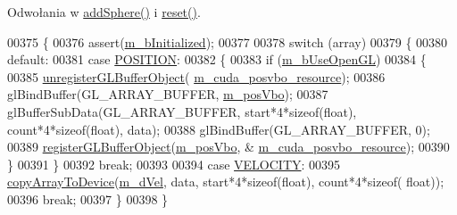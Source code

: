 Odwołania w \hyperlink{particle_system_8cpp_source_l00485}{add\-Sphere()} i \hyperlink{particle_system_8cpp_source_l00436}{reset()}.


\begin{DoxyCode}
00375 \{
00376     assert(\hyperlink{class_particle_system_a21bbfba9d8701a70bc6fddbf4fc3f5bd}{m\_bInitialized});
00377 
00378     \textcolor{keywordflow}{switch} (array)
00379     \{
00380         \textcolor{keywordflow}{default}:
00381         \textcolor{keywordflow}{case} \hyperlink{class_particle_system_a332fbe57a36aaea5c18b4ea4fba6bbb3a9e9a2992d230a2674debf26e0e8e0299}{POSITION}:
00382             \{
00383                 \textcolor{keywordflow}{if} (\hyperlink{class_particle_system_a5d99413ffc0791e6aa9f02308caf7f1e}{m\_bUseOpenGL})
00384                 \{
00385                     \hyperlink{particle_system_8cuh_a9afef8c00ca779aae2d7484b45bce34c}{unregisterGLBufferObject}(
      \hyperlink{class_particle_system_a9c5de70c1705672e5722ad30dee1b14b}{m\_cuda\_posvbo\_resource});
00386                     glBindBuffer(GL\_ARRAY\_BUFFER, \hyperlink{class_particle_system_a31f9cccdf5dbae6f72867665bd8761e3}{m\_posVbo});
00387                     glBufferSubData(GL\_ARRAY\_BUFFER, start*4*\textcolor{keyword}{sizeof}(\textcolor{keywordtype}{float}), count*4*\textcolor{keyword}{sizeof}(\textcolor{keywordtype}{float}), data);
00388                     glBindBuffer(GL\_ARRAY\_BUFFER, 0);
00389                     \hyperlink{particle_system_8cuh_a4386a84282ceeaba09939817aa2a9c24}{registerGLBufferObject}(\hyperlink{class_particle_system_a31f9cccdf5dbae6f72867665bd8761e3}{m\_posVbo}, &
      \hyperlink{class_particle_system_a9c5de70c1705672e5722ad30dee1b14b}{m\_cuda\_posvbo\_resource});
00390                 \}
00391             \}
00392             \textcolor{keywordflow}{break};
00393 
00394         \textcolor{keywordflow}{case} \hyperlink{class_particle_system_a332fbe57a36aaea5c18b4ea4fba6bbb3a3702de73065f01b4f6ffa604b799e53d}{VELOCITY}:
00395             \hyperlink{particle_system_8cuh_ac4d4ecd921dbed6c2deef639ca295374}{copyArrayToDevice}(\hyperlink{class_particle_system_a5efd31a2fdba8d98b105f4e546964cb5}{m\_dVel}, data, start*4*\textcolor{keyword}{sizeof}(\textcolor{keywordtype}{float}), count*4*\textcolor{keyword}{sizeof}(\textcolor{keywordtype}{
      float}));
00396             \textcolor{keywordflow}{break};
00397     \}
00398 \}
\end{DoxyCode}


